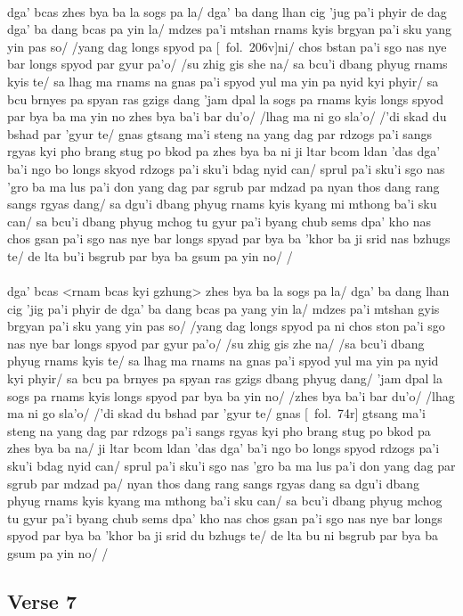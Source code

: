 \documentclass[12pt]{article}
\begin{document}
\textbf{\TVA}\\
dga' bcas zhes bya ba la sogs pa la/ dga' ba dang lhan cig 'jug pa'i phyir de dag dga' ba dang bcas pa yin la/ mdzes pa'i mtshan rnams kyis brgyan pa'i sku yang yin pas so/ /yang dag longs spyod pa [\TVA\ fol.\ 206v]ni/ chos bstan pa'i sgo nas nye bar longs spyod par gyur pa'o/ /su zhig gis she na/ sa bcu'i dbang phyug rnams kyis te/ sa lhag ma rnams na gnas pa'i spyod yul ma yin pa nyid kyi phyir/ sa bcu brnyes pa spyan ras gzigs dang 'jam dpal la sogs pa rnams kyis longs spyod par bya ba ma yin no zhes bya ba'i bar du'o/ /lhag ma ni go sla'o/ /'di skad du bshad par 'gyur te/ gnas gtsang ma'i steng na yang dag par rdzogs pa'i sangs rgyas kyi pho brang stug po bkod pa zhes bya ba ni ji ltar bcom ldan 'das dga' ba'i ngo bo longs skyod rdzogs pa'i sku'i bdag nyid can/ sprul pa'i sku'i sgo nas 'gro ba ma lus pa'i don yang dag par sgrub par mdzad pa nyan thos dang rang sangs rgyas dang/ sa dgu'i dbang phyug rnams kyis kyang mi mthong ba'i sku can/ sa bcu'i dbang phyug mchog tu gyur pa'i byang chub sems dpa' kho nas chos gsan pa'i sgo nas nye bar longs spyad par bya ba 'khor ba ji srid nas bzhugs te/ de lta bu'i bsgrub par bya ba gsum pa yin no/ /\\

\textbf{\TVB}\\
dga' bcas <rnam bcas kyi gzhung> zhes bya ba la sogs pa la/ dga' ba dang lhan cig 'jig pa'i phyir de dga' ba dang bcas pa yang yin la/ mdzes pa'i mtshan gyis brgyan pa'i sku yang yin pas so/ /yang dag longs spyod pa ni chos ston pa'i sgo nas nye bar longs spyod par gyur pa'o/ /su zhig gis zhe na/ /sa bcu'i dbang phyug rnams kyis te/ sa lhag ma rnams na gnas pa'i spyod yul ma yin pa nyid kyi phyir/ sa bcu pa brnyes pa spyan ras gzigs dbang phyug dang/ 'jam dpal la sogs pa rnams kyis longs spyod par bya ba yin no/ /zhes bya ba'i bar du'o/ /lhag ma ni go sla'o/ /'di skad du bshad par 'gyur te/ gnas [\TVB\ fol.\ 74r] gtsang ma'i steng na yang dag par rdzogs pa'i sangs rgyas kyi pho brang stug po bkod pa zhes bya ba na/ ji ltar bcom ldan 'das dga' ba'i ngo bo longs spyod rdzogs pa'i sku'i bdag nyid can/ sprul pa'i sku'i sgo nas 'gro ba ma lus pa'i don yang dag par sgrub par mdzad pa/ nyan thos dang rang sangs rgyas dang sa dgu'i dbang phyug rnams kyis kyang ma mthong ba'i sku can/ sa bcu'i dbang phyug mchog tu gyur pa'i byang chub sems dpa' kho nas chos gsan pa'i sgo nas nye bar longs spyod par bya ba 'khor ba ji srid du bzhugs te/ de lta bu ni bsgrub par bya ba gsum pa yin no/ /

\subsection{Verse 7}
\end{document}
